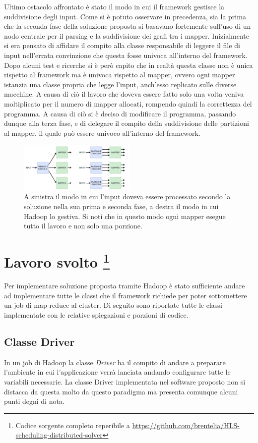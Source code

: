 \documentclass[]{IEEEtran}
\begin{document}
Ultimo ostacolo affrontato è stato il modo in cui il framework gestisce la suddivisione degli input. Come si è potuto osservare in precedenza, sia la prima che la seconda fase della soluzione proposta si basavano fortemente sull'uso di un nodo centrale per il parsing e la suddivisione dei grafi tra i mapper. Inizialmente si era pensato di affidare il compito alla classe responsabile di leggere il file di input nell'errata convinzione che questa fosse univoca all'interno del framework. Dopo alcuni test e ricerche si è però capito che in realtà questa classe non è unica rispetto al framework ma è univoca rispetto al mapper, ovvero ogni mapper istanzia una classe propria che legge l'input, anch'esso replicato sulle diverse macchine. A causa di ciò il lavoro che doveva essere fatto solo una volta veniva moltiplicato per il numero di mapper allocati, rompendo quindi la correttezza del programma. A causa di ciò si è deciso di modificare il programma, passando dunque alla terza fase, e di delegare il compito della suddivisione delle partizioni al mapper, il quale può essere univoco all'interno del framework.
\begin{figure}
	\centering
	\includegraphics[width=0.5\textwidth]{images/hadoop_input.png}
	\caption{A sinistra il modo in cui l'input doveva essere processato secondo la soluzione nella sua prima e seconda fase, a destra il modo in cui Hadoop lo gestiva. Si noti che in questo modo ogni mapper esegue tutto il lavoro e non solo una porzione.}
\end{figure}

\section[Lavoro]{Lavoro svolto \footnote{Codice sorgente completo reperibile a \url{https://github.com/brentelia/HLS-scheduling-distributed-solver}}} \label{work}
Per implementare soluzione proposta tramite Hadoop è stato sufficiente andare ad implementare tutte le classi che il framework richiede per poter sottomettere un job  di map-reduce al cluster. Di seguito sono riportate tutte le classi implementate con le relative spiegazioni e porzioni di codice.
\subsection{Classe Driver}
In un job di Hadoop la classe \emph{Driver} ha il compito di andare a preparare  l'ambiente in cui l'applicazione verrà lanciata andando configurare tutte le variabili necessarie. La classe Driver implementata nel software proposto non si distacca da questa molto da questo paradigma ma presenta comunque alcuni punti degni di nota.
\end{document}
